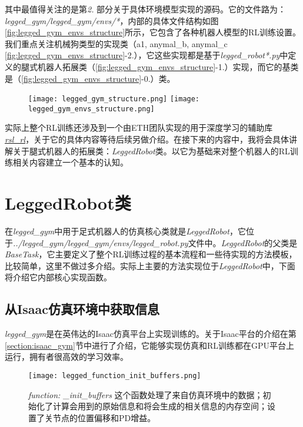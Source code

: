 其中最值得关注的是第\emph{2. }部分关于具体环境模型实现的源码。它的文件路为：\emph{legged\_gym/legged\_gym/envs/*}，内部的具体文件结构如图\ref{fig:legged_gym_envs_structure}所示，它包含了各种机器人模型的RL训练设置。我们重点关注机械狗类型的实现类（a1, anymal\_b, anymal\_c \ref{fig:legged_gym_envs_structure}-2.），它这些实现都是基于\emph{legged\_robot*.py}中定义的腿式机器人拓展类（\ref{fig:legged_gym_envs_structure}-1.）实现，而它的基类是（\ref{fig:legged_gym_envs_structure}-0.）类。

\begin{figure}
  \centering
  {\texttt{[image: legged\_gym\_structure.png]}}
  {\texttt{[image: legged\_gym\_envs\_structure.png]}}
\end{figure}

实际上整个RL训练还涉及到一个由ETH团队实现的用于深度学习的辅助库\href{https://github.com/leggedrobotics/rsl_rl}{\emph{rsl\_rl}}，关于它的具体内容等待后续另做介绍。在接下来的内容中，我将会具体讲解关于腿式机器人的拓展类：\emph{LeggedRobot}类。以它为基础来对整个机器人的RL训练相关内容建立一个基本的认知。









\section[LeggedRobot类]{LeggedRobot类}
在\emph{legged\_gym}中用于足式机器人的仿真核心类就是\emph{LeggedRobot}，它位于\emph{../legged\_gym/legged\_gym/envs/legged\_robot.py}文件中。\emph{LeggedRobot}的父类是\emph{BaseTask}，它主要定义了整个RL训练过程的基本流程和一些待实现的方法模板，比较简单，这里不做过多介绍。实际上主要的方法实现位于\emph{LeggedRobot}中，下面将介绍它内部核心实现函数。


\subsection[从Isaac仿真环境中获取信息]{从Isaac仿真环境中获取信息}
\emph{legged\_gym}是在英伟达的Isaac仿真平台上实现训练的。关于Isaac平台的介绍在第\ref{section:isaac_gym}节中进行了介绍，它能够实现仿真和RL训练都在GPU平台上运行，拥有者很高效的学习效率。

\begin{figure}
  \centering
  \caption{\emph{function: \_init\_buffers} 这个函数处理了来自仿真环境中的数据；初始化了计算会用到的原始信息和将会生成的相关信息的内存空间；设置了关节点的位置偏移和PD增益。}
  \label{fig:legged_function_init_buffers}
  \texttt{[image: legged\_function\_init\_buffers.png]}
\end{figure}

